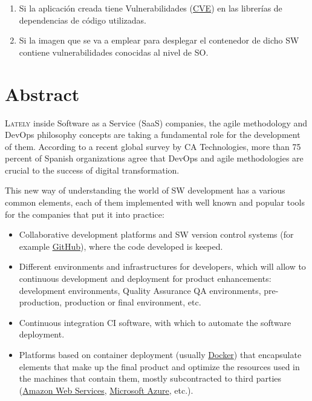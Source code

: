 \begin{enumerate}
	\item Si la aplicación creada tiene Vulnerabilidades (\href{https://cve.mitre.org/}{\gls{CVE}}) en las librerías de dependencias de código utilizadas.
	\item Si la imagen que se va a emplear para desplegar el contenedor de dicho \gls{SW} contiene vulnerabilidades conocidas al nivel de \gls{SO}.
\end{enumerate}


\chapter*{Abstract}
\pagestyle{especial}
{}

\lettrine[lraise=-0.1, lines=2, loversize=0.2]{L}{ately} inside Software as a Service (\gls{SaaS}) companies, the agile methodology and \gls{DevOps} philosophy concepts are taking a fundamental role for the development of them\cite{consultorit2017}. According to a recent global survey by CA Technologies, more than 75 percent of Spanish organizations agree that DevOps and agile methodologies are crucial to the success of digital transformation\cite{catechnologies2017}.

This new way of understanding the world of \gls{SW} development has a various common elements, each of them implemented with well known and popular tools for the companies that put it into practice:

\begin{itemize}
\item Collaborative development platforms and \gls{SW} version control systems (for example \href{https://github.com/}{GitHub}), where the code developed is keeped.
\item Different environments and infrastructures for developers, which will allow to continuous development and deployment for product enhancements: development environments, Quality Assurance \gls{QA} environments, pre-production, production or final environment, etc.
\item Continuous integration \gls{CI} software, with which to automate the software deployment.
\item Platforms based on container deployment (usually \href{https://www.docker.com/}{Docker}) that encapsulate elements that make up the final product and optimize the resources used in the machines that contain them, mostly subcontracted to third parties (\href{https://aws.amazon.com/es/}{Amazon Web Services}, \href{https://azure.microsoft.com/es-es/}{Microsoft Azure}, etc.).
\end{itemize}

